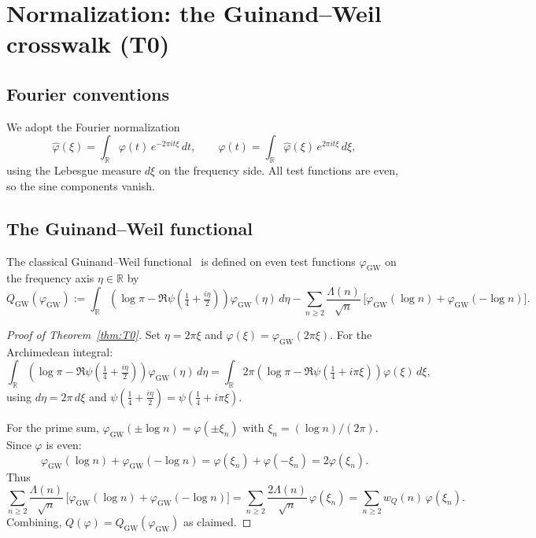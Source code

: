 \documentclass[11pt,a4paper]{article}
\theoremstyle{definition}
\theoremstyle{remark}
\newcommand{\R}{\mathbb{R}}
\begin{document}
\section{Normalization: the Guinand--Weil crosswalk (T0)}

\subsection{Fourier conventions}

We adopt the Fourier normalization
\begin{equation}\label{eq:Fourier}
  \widehat{\varphi}(\xi) = \int_\R \varphi(t)\, e^{-2\pi i t \xi}\, dt, \qquad
  \varphi(t) = \int_\R \widehat{\varphi}(\xi)\, e^{2\pi i t \xi}\, d\xi,
\end{equation}
using the Lebesgue measure $d\xi$ on the frequency side. All test functions are even, so the sine components vanish.

\subsection{The Guinand--Weil functional}

The classical Guinand--Weil functional~\cite{Guinand1948,Weil1952} is defined on even test functions $\varphi_{\mathrm{GW}}$ on the frequency axis $\eta \in \R$ by
\begin{equation}\label{eq:Q-GW}
  Q_{\mathrm{GW}}(\varphi_{\mathrm{GW}}) := \int_\R \left( \log\pi - \Re\psi\left(\tfrac{1}{4} + \tfrac{i\eta}{2}\right) \right) \varphi_{\mathrm{GW}}(\eta)\, d\eta
  - \sum_{n \geq 2} \frac{\Lambda(n)}{\sqrt{n}}\, \bigl[ \varphi_{\mathrm{GW}}(\log n) + \varphi_{\mathrm{GW}}(-\log n) \bigr].
\end{equation}

\begin{proof}[Proof of Theorem~\ref{thm:T0}]
Set $\eta = 2\pi\xi$ and $\varphi(\xi) = \varphi_{\mathrm{GW}}(2\pi\xi)$. For the Archimedean integral:
\[
  \int_\R \left( \log\pi - \Re\psi\left(\tfrac{1}{4} + \tfrac{i\eta}{2}\right) \right) \varphi_{\mathrm{GW}}(\eta)\, d\eta
  = \int_\R 2\pi \left( \log\pi - \Re\psi\left(\tfrac{1}{4} + i\pi\xi\right) \right) \varphi(\xi)\, d\xi,
\]
using $d\eta = 2\pi\, d\xi$ and $\psi(\tfrac{1}{4} + \tfrac{i\eta}{2}) = \psi(\tfrac{1}{4} + i\pi\xi)$.

For the prime sum, $\varphi_{\mathrm{GW}}(\pm \log n) = \varphi(\pm \xi_n)$ with $\xi_n = (\log n)/(2\pi)$. Since $\varphi$ is even:
\[
  \varphi_{\mathrm{GW}}(\log n) + \varphi_{\mathrm{GW}}(-\log n) = \varphi(\xi_n) + \varphi(-\xi_n) = 2\varphi(\xi_n).
\]
Thus
\[
  \sum_{n \geq 2} \frac{\Lambda(n)}{\sqrt{n}}\, \bigl[ \varphi_{\mathrm{GW}}(\log n) + \varphi_{\mathrm{GW}}(-\log n) \bigr]
  = \sum_{n \geq 2} \frac{2\Lambda(n)}{\sqrt{n}}\, \varphi(\xi_n) = \sum_{n \geq 2} w_Q(n)\, \varphi(\xi_n).
\]
Combining, $Q(\varphi) = Q_{\mathrm{GW}}(\varphi_{\mathrm{GW}})$ as claimed.
\end{proof}
\end{document}

